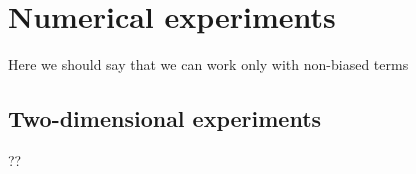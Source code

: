\documentclass[english,11pt]{article}
\numberwithin{equation}{section}
\theoremstyle{plain}
\theoremstyle{definition}
\theoremstyle{remark}
\theoremstyle{plain}
\theoremstyle{remark}
\theoremstyle{plain}
\theoremstyle{plain}
\begin{document}
\section{Numerical experiments}   \label{sec:numerics}

Here we should say that we can work only with non-biased terms


\subsection{Two-dimensional experiments} 


?? 

%
%
% 
\end{document}
